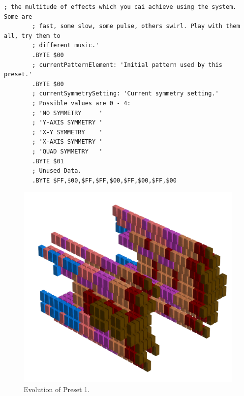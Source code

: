 \begin{lstlisting}[basicstyle=\tiny,caption=Source code for Preset 0.]
        ; the multitude of effects which you cai achieve using the system. Some are
        ; fast, some slow, some pulse, others swirl. Play with them all, try them to
        ; different music.'
        .BYTE $00
        ; currentPatternElement: 'Initial pattern used by this preset.'
        .BYTE $00
        ; currentSymmetrySetting: 'Current symmetry setting.'
        ; Possible values are 0 - 4:
        ; 'NO SYMMETRY     '
        ; 'Y-AXIS SYMMETRY '
        ; 'X-Y SYMMETRY    '
        ; 'X-AXIS SYMMETRY '
        ; 'QUAD SYMMETRY   '
        .BYTE $01
        ; Unused Data.
        .BYTE $FF,$00,$FF,$FF,$00,$FF,$00,$FF,$00
\end{lstlisting}


\clearpage                                                                 
\begin{figure}[H]                                                          
    \centering                                                             
    \begin{adjustbox}{width=14cm,center}                                   
      \includegraphics[width=14cm]{src/presets/pattern1-45.png}%
    \end{adjustbox}                                                        
\caption{Evolution of Preset 1.}                                           
\end{figure}                                                               
\clearpage                                                                 
                                                                           
